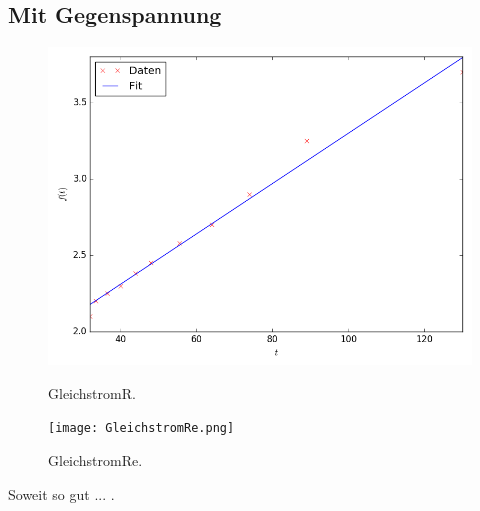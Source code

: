 \subsection{ Mit Gegenspannung}

\begin{figure}[H]
	\centering
	\caption{GleichstromR.}
	\includegraphics[width=\linewidth-150pt,height=\textheight-150pt,keepaspectratio]{GleichstromR.png}
	\label{fig:GleichstromR}
\end{figure}


\begin{figure}[H]
	\centering
	\caption{GleichstromRe.}
	\texttt{[image: GleichstromRe.png]}
	\label{fig:GleichstromRe}
\end{figure}
\cite{scipy}
Soweit so gut ... .
